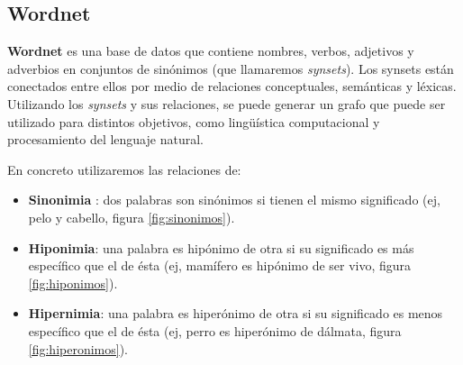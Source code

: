 \documentclass[12,twoside]{TFG-GM}
\theoremstyle{definition}
\theoremstyle{remark}
\begin{document}
\subsection{Wordnet}

\textbf{Wordnet} es una base de datos que contiene nombres, verbos, adjetivos y adverbios en conjuntos de sinónimos (que llamaremos \textit{synsets}). Los synsets están conectados entre ellos por medio de relaciones conceptuales, semánticas y léxicas. Utilizando los \textit{synsets} y sus relaciones, se puede generar un grafo que puede ser utilizado para distintos objetivos, como lingüística computacional y procesamiento del lenguaje natural. 

En concreto utilizaremos las relaciones de: 
\begin{itemize}

\item \textbf{Sinonimia} : dos palabras son sinónimos si tienen el mismo significado (ej, pelo y cabello, figura \ref{fig:sinonimos}).
\item \textbf{Hiponimia}: una palabra es hipónimo de otra si su significado es más específico que el de ésta (ej, mamífero es hipónimo de ser vivo, figura \ref{fig:hiponimos}). 
\item \textbf{Hipernimia}: una palabra es hiperónimo de otra si su significado es menos específico que el de ésta (ej, perro es hiperónimo de dálmata, figura \ref{fig:hiperonimos}). 
 
\end{itemize}
\end{document}
